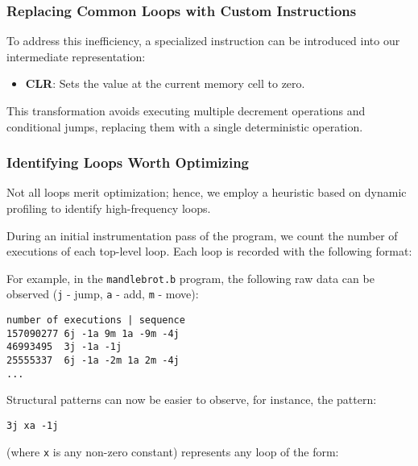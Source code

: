 \subsubsection*{Replacing Common Loops with Custom Instructions}

\par To address this inefficiency, a specialized instruction can be introduced into our intermediate representation:

\begin{itemize}
    \item \textbf{CLR}: Sets the value at the current memory cell to zero.
\end{itemize}

\par This transformation avoids executing multiple decrement operations and conditional jumps, replacing them with a single deterministic operation.

\subsubsection*{Identifying Loops Worth Optimizing}

\par Not all loops merit optimization; hence, we employ a heuristic based on dynamic profiling to identify high-frequency loops.

\par During an initial instrumentation pass of the program, we count the number of executions of each top-level loop. Each loop is recorded with the following format:

\par For example, in the \texttt{mandlebrot.b} program, the following raw data can be observed (\texttt{j} - jump, \texttt{a} - add, \texttt{m} - move):

\begin{verbatim}
number of executions | sequence
157090277 6j -1a 9m 1a -9m -4j
46993495  3j -1a -1j
25555337  6j -1a -2m 1a 2m -4j
...
\end{verbatim}

\par Structural patterns can now be easier to observe, for instance, the pattern:

\begin{verbatim}
3j xa -1j
\end{verbatim}

\par (where \texttt{x} is any non-zero constant) represents any loop of the form:


